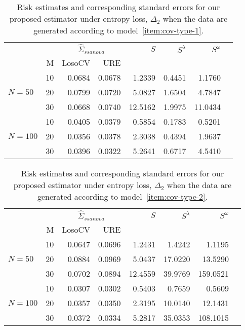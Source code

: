 \documentclass[12pt]{article}
\theoremstyle{definition}
\begin{document}
\begin{table}[H]
\centering
\caption{Risk estimates and corresponding standard errors for our proposed estimator under entropy loss, $\Delta_2$ when the data are generated according to model~\ref{item:cov-type-1}.} 
\begin{tabular}{l|r|rrrrrr}
&  & \multicolumn{2}{c}{$\hat{\Sigma}_{ssanova}$} & $S$ & $S^\lambda$ & $S^\omega$ \\ 
&M & \mbox{LosoCV} & \mbox{URE} &  \\ 
  \hline
&    10 & 0.0684 & 	0.0678	&1.2339 & 0.4451 & 1.1760\\ 
$N = 50$ &    20 & 0.0799 & 	0.0720	&5.0827 & 1.6504 & 4.7847 \\ 
  &    30 & 0.0668 &	0.0740	 &12.5162  & 1.9975 & 11.0434 \\ 
   \hdashline
 &    10 & 0.0405 & 0.0379 & 0.5854  & 0.1783 & 0.5201 \\ 
$N = 100$ &    20 & 0.0356 &  0.0378 & 2.3038 & 0.4394 & 1.9637 \\ 
  &    30 & 0.0396 & 0.0322  &5.2641 & 0.6717 & 4.5410 \\ 
\end{tabular}
\end{table}



\begin{table}[H]
\centering
\caption{Risk estimates and corresponding standard errors for our proposed estimator under entropy loss, $\Delta_2$ when the data are generated according to model~\ref{item:cov-type-2}.} \begin{tabular}{l|r|rrrrrr}
&  & \multicolumn{2}{c}{$\hat{\Sigma}_{ssanova}$} & $S$ & $S^\lambda$ & $S^\omega$ \\ 
&M & \mbox{LosoCV} & \mbox{URE} &  \\ 
  \hline
 &    10 & 0.0647 & 0.0696	 & 1.2431 & 1.4242 & 1.1195\\ 
$N = 50$ &    20 & 0.0884 & 0.0969 & 5.0437 & 17.0220 & 13.5290\\ 
&    30 & 0.0702 & 0.0894 & 12.4559 & 39.9769 & 159.0521 \\ 
   \hdashline
&    10 & 0.0307 & 0.0302 & 0.5403& 0.7659 & 0.5609 \\ 
$N = 100 $ &    20 & 0.0357 & 0.0350  & 2.3195 & 10.0140 & 12.1431 \\ 
   &    30 & 0.0372 & 0.0334 & 5.2817& 35.0353 & 108.1015  \\ 
\end{tabular}
\end{table}
\end{document}
